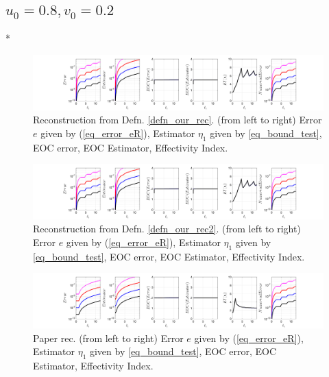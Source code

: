 \documentclass[12pt,a4paper]{article}
\numberwithin{equation}{section}
\theoremstyle{definition}
\begin{document}
\subsection*{$u_0=0.8, v_0= 0.2$}
\/*
\begin{figure}[H]
	\hspace{-3cm}
	\includegraphics[scale=0.55]{fig_LeapFrogplots_1x5_sin_IC_harmonic_order_2_u8_v2_rec_george}	
	\caption{Reconstruction from Defn. \ref{defn_our_rec}. (from left to right) Error $e$ given by (\ref{eq_error_eR}), Estimator $\eta_1$ given by \ref{eq_bound_test},   EOC error, EOC Estimator, Effectivity Index.}
	\label{fig_all_in_one_our_rec_george_u8_v2}
\end{figure}
\begin{figure}[H]
	\hspace{-3cm}
	\includegraphics[scale=0.55]{fig_LeapFrogplots_1x5_sin_IC_harmonic_order_2_u8_v2_rec2}	
	\caption{Reconstruction from Defn. \ref{defn_our_rec2}. (from left to right) Error $e$ given by (\ref{eq_error_eR}), Estimator $\eta_1$ given by \ref{eq_bound_test},   EOC error, EOC Estimator, Effectivity Index.}
	\label{fig_all_in_one_our_rec_2_u8_v2}
\end{figure}
\begin{figure}[H]
	\hspace{-3cm}
	\includegraphics[scale=0.55]{fig_LeapFrogplots_1x5_sin_IC_harmonic_u8_v2_paperrec}	
	\caption{Paper rec. (from left to right) Error $e$ given by (\ref{eq_error_eR}), Estimator $\eta_1$ given by \ref{eq_bound_test},   EOC error, EOC Estimator, Effectivity Index.}
	\label{fig_all_in_one_paperrec_u08_v02}
\end{figure}
\end{document}
